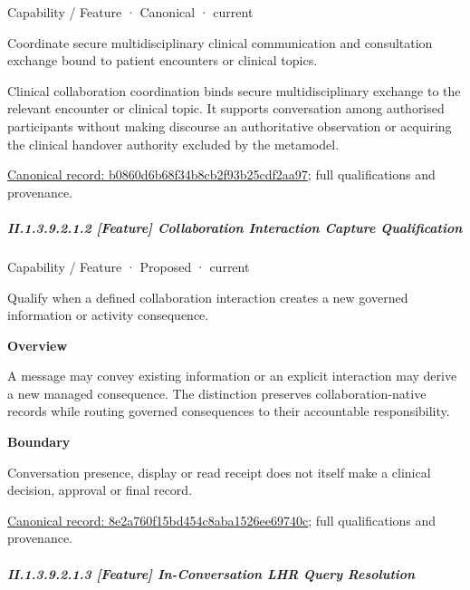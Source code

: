\label{element:b0860d6b68f34b8cb2f93b25cdf2aa97}
{\small Capability / Feature · Canonical · current}\par

Coordinate secure multidisciplinary clinical communication and consultation exchange bound to patient encounters or clinical topics.



Clinical collaboration coordination binds secure multidisciplinary exchange to the relevant encounter or clinical topic. It supports conversation among authorised participants without making discourse an authoritative observation or acquiring the clinical handover authority excluded by the metamodel.


{\footnotesize \href{../../../../../../../continuum/strategy/capability/feature/b0860d6b68f34b8cb2f93b25cdf2aa97.md}{Canonical record: b0860d6b68f34b8cb2f93b25cdf2aa97}; full qualifications and provenance.}\par
\subparagraph*{II.1.3.9.2.1.2 [Feature] Collaboration Interaction Capture Qualification}
\label{navigation:II.1.3.9.2.1.2}

\label{element:8e2a760f15bd454c8aba1526ee69740c}
{\small Capability / Feature · Proposed · current}\par

Qualify when a defined collaboration interaction creates a new governed information or activity consequence.



\textbf{Overview}



A message may convey existing information or an explicit interaction may derive a new managed consequence. The distinction preserves collaboration-native records while routing governed consequences to their accountable responsibility.



\textbf{Boundary}



Conversation presence, display or read receipt does not itself make a clinical decision, approval or final record.


{\footnotesize \href{../../../../../../../continuum/strategy/capability/feature/8e2a760f15bd454c8aba1526ee69740c.md}{Canonical record: 8e2a760f15bd454c8aba1526ee69740c}; full qualifications and provenance.}\par
\subparagraph*{II.1.3.9.2.1.3 [Feature] In-Conversation LHR Query Resolution}
\label{navigation:II.1.3.9.2.1.3}

